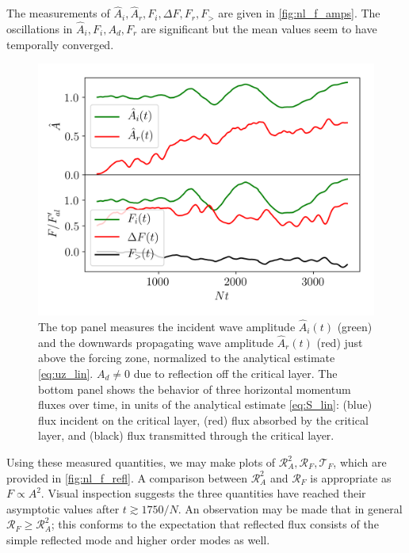 \documentclass[
        fleqn,
        usenatbib,
    ]{mnras}
\begin{document}
The measurements of $\hat{A}_i, \hat{A}_r, F_i, \Delta F, F_r, F_>$ are given in
\autoref{fig:nl_f_amps}. The oscillations in $\hat{A}_i, F_i, A_d, F_r$ are
significant but the mean values seem to have temporally converged.

\begin{figure}
    \centering
    \includegraphics[width=\columnwidth]{plots/nl_f_amps.png}
    \caption{The top panel measures the incident wave amplitude $\hat{A}_i(t)$
    (green) and the downwards propagating wave amplitude $\hat{A}_r(t)$ (red)
    just above the forcing zone, normalized to the analytical estimate
    \autoref{eq:uz_lin}. $A_d \neq 0$ due to reflection off the critical layer.
    The bottom panel shows the behavior of three horizontal momentum fluxes over
    time, in units of the analytical estimate \autoref{eq:S_lin}: (blue) flux
    incident on the critical layer, (red) flux absorbed by the critical layer,
    and (black) flux transmitted through the critical
    layer.}\label{fig:nl_f_amps}
\end{figure}

Using these measured quantities, we may make plots of $\mathcal{R}_A^2,
\mathcal{R}_F, \mathcal{T}_F$, which are provided in \autoref{fig:nl_f_refl}. A
comparison between $\mathcal{R}_A^2$ and $\mathcal{R}_F$ is appropriate as $F
\propto A^2$. Visual inspection suggests the three quantities have reached
their asymptotic values after $t \gtrsim 1750/N$. An observation may be made
that in general $\mathcal{R}_F \geq \mathcal{R}_A^2$; this conforms to the
expectation that reflected flux consists of the simple reflected mode and higher
order modes as well.
\end{document}
